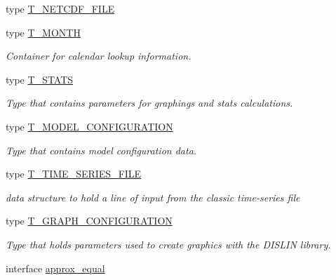 \begin{DoxyCompactItemize}
type \hyperlink{typetypes_1_1_t___n_e_t_c_d_f___f_i_l_e}{T\_\-NETCDF\_\-FILE}
\item 
type \hyperlink{typetypes_1_1_t___m_o_n_t_h}{T\_\-MONTH}
\begin{DoxyCompactList}\small\item\em Container for calendar lookup information. \item\end{DoxyCompactList}\item 
type \hyperlink{typetypes_1_1_t___s_t_a_t_s}{T\_\-STATS}
\begin{DoxyCompactList}\small\item\em Type that contains parameters for graphings and stats calculations. \item\end{DoxyCompactList}\item 
type \hyperlink{typetypes_1_1_t___m_o_d_e_l___c_o_n_f_i_g_u_r_a_t_i_o_n}{T\_\-MODEL\_\-CONFIGURATION}
\begin{DoxyCompactList}\small\item\em Type that contains model configuration data. \item\end{DoxyCompactList}\item 
type \hyperlink{typetypes_1_1_t___t_i_m_e___s_e_r_i_e_s___f_i_l_e}{T\_\-TIME\_\-SERIES\_\-FILE}
\begin{DoxyCompactList}\small\item\em data structure to hold a line of input from the classic time-\/series file \item\end{DoxyCompactList}\item 
type \hyperlink{typetypes_1_1_t___g_r_a_p_h___c_o_n_f_i_g_u_r_a_t_i_o_n}{T\_\-GRAPH\_\-CONFIGURATION}
\begin{DoxyCompactList}\small\item\em Type that holds parameters used to create graphics with the DISLIN library. \item\end{DoxyCompactList}\item 
interface \hyperlink{interfacetypes_1_1approx__equal}{approx\_\-equal}
\end{DoxyCompactItemize}
